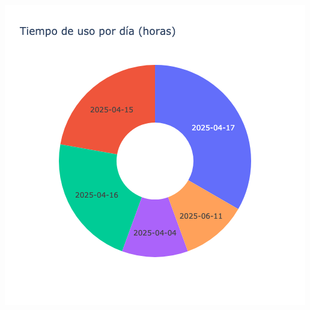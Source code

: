 \documentclass{article}
\begin{document}
    \begin{minipage}{0.48\textwidth}
        \centering
        \includegraphics[width=\textwidth]{../img/pie/UD101-180Dias-26-09-2025.png}
    \end{minipage}
    
\end{document}
